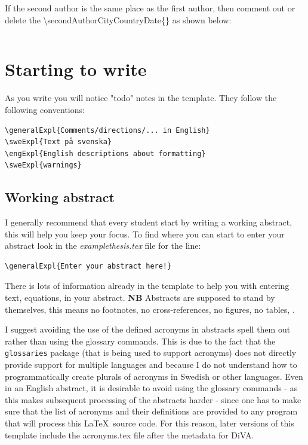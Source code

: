 \documentclass[examplethesis.tex]{subfiles}
\begin{document}
If the second author is the same place as the first author, then comment out or delete the \textbackslash secondAuthorCityCountryDate\{\} as shown below:
\begin{lstlisting}[style=latexExampleForAuthors]
%\secondAuthorCityCountryDate{}
\end{lstlisting}

\section{Starting to write}
\label{sec:startingToWrite}

As you write you will notice "todo" notes in the template. They follow the following conventions:
\begin{lstlisting}[style=latexExampleForAuthors]
\generalExpl{Comments/directions/... in English}
\sweExpl{Text på svenska}
\engExpl{English descriptions about formatting}
\sweExpl{warnings}
\end{lstlisting}


\subsection{Working abstract}
\label{sec:wrtingFirstAbstract}
I generally recommend that every student start by writing a working abstract, this will help you keep your focus. To find where you can start to enter your abstract look in the \textit{examplethesis.tex} file for the line:
\begin{lstlisting}[style=latexExampleForAuthors]
\generalExpl{Enter your abstract here!}
\end{lstlisting}

There is lots of information already in the template to help you with entering text, equations, \etc in your abstract. \textbf{NB} Abstracts are supposed to stand by themselves, this means no footnotes, no cross-references, no figures, no tables, \etc.

I suggest avoiding the use of the defined acronyms in abstracts \ie spell them out rather than using the glossary commands. This is due to the fact that the \texttt{glossaries} package (that is being used to support acronyms) does not directly provide support for multiple languages and because I do not understand how to programmatically create plurals of acronyms in Swedish or other languages. Even in an English abstract, it is desirable to avoid using the glossary commands - as this makes subsequent processing of the abstracts harder - since one has to make sure that the list of acronyms and their definitions are provided to any program that will process this \LaTeX\  source code. For this reason, later versions of this template include the acronyms.tex file after the metadata for DiVA.
\end{document}
